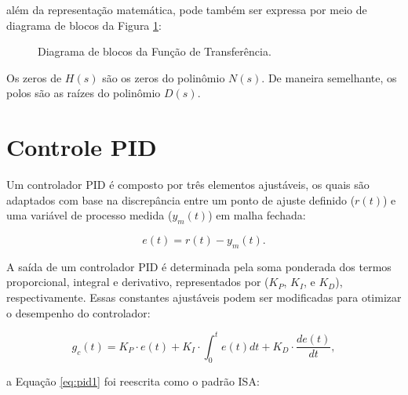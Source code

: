 \documentclass[12pt,           %
a4paper,                       %
openany,                       %
oneside,                       %
chapter=TITLE,                 %
english,                       %
spanish,                       %
brazil,                        %
sumario=tradicional]{abntex2}  %
\begin{document}
\begin{OnehalfSpace}
\noindent além da representação matemática, pode também ser expressa por meio de diagrama de blocos da Figura \ref{fig:sys}:

\begin{figure}[H] %
\vspace*{-0.3cm}
\centering
\caption{Diagrama de blocos da Função de Transferência.}
\label{fig:sys}
\end{figure}
\vspace*{-0.7cm}
{\raggedright {}}

Os zeros de $H(s)$ são os zeros do polinômio $N(s)$. De maneira semelhante, os polos são as raízes do polinômio $D(s)$.

\section{Controle PID}
\label{sec:Controle PID}

Um controlador PID é composto por três elementos ajustáveis, os quais são adaptados com base na discrepância entre um ponto de ajuste definido (\(r(t)\)) e uma variável de processo medida (\(y_m(t)\)) em malha fechada:

\begin{equation}
    \label{eq:erro}   %
        e(t) = r(t) - y_m(t).
\end{equation}

A saída de um controlador PID é determinada pela soma ponderada dos termos proporcional, integral e derivativo, representados por (\(K_P\), \(K_I\), e \(K_D\)), respectivamente. Essas constantes ajustáveis podem ser modificadas para otimizar o desempenho do controlador:

\begin{equation}
    \label{eq:pid1}
        g_c(t) = K_P \cdot e(t) + K_I\cdot \int_0^t e(t) dt + K_D \cdot \frac{de(t)}{dt},
\end{equation}

\noindent a Equação \ref{eq:pid1} foi reescrita como o padrão ISA:


\end{OnehalfSpace}
\end{document}
